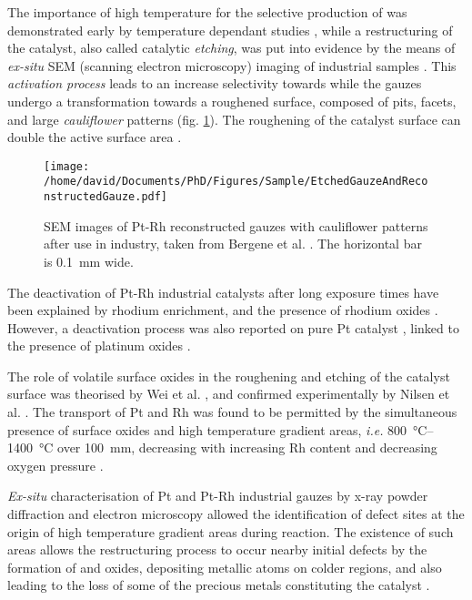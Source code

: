 The importance of high temperature for the selective production of  was demonstrated early by temperature dependant studies \parencite{Nutt1968, Pignet1974, Li1997}, while a restructuring of the catalyst, also called catalytic \textit{etching}, was put into evidence by the means of \textit{ex-situ} SEM (scanning electron microscopy) imaging of industrial samples \parencite{McCabe1974, FlytzaniStephanopoulos1979, McCabe1986}.
This \textit{activation process} leads to an increase selectivity towards  while the gauzes undergo a transformation towards a roughened surface, composed of pits, facets, and large \textit{cauliflower} patterns (fig. \ref{fig:Gauzes}).
The roughening of the catalyst surface can double the active surface area \parencite{Hatscher2008}.

\begin{figure}[!htb]
    \centering
    \texttt{[image: /home/david/Documents/PhD/Figures/Sample/EtchedGauzeAndReconstructedGauze.pdf]}
    \caption{
    SEM images of Pt-Rh reconstructed gauzes with cauliflower patterns after use in industry, taken from Bergene et al. \parencite*{Bergene1996}.
    The horizontal bar is \qty{0.1}{\mm} wide.
    }
    \label{fig:Gauzes}
\end{figure}

The deactivation of Pt-Rh industrial catalysts after long exposure times have been explained by rhodium enrichment, and the presence of rhodium oxides \parencite{Fierro1990, Fierro1992, Bergene1996}.
However, a deactivation process was also reported on pure Pt catalyst \parencite{Ostermaier1974}, linked to the presence of platinum oxides \parencite{Ostermaier1976}.

The role of volatile surface oxides in the roughening and etching of the catalyst surface was theorised by Wei et al. \parencite*{Wei1996}, and confirmed experimentally by Nilsen et al. \parencite*{Nilsen2001}.
The transport of Pt and Rh was found to be permitted by the simultaneous presence of surface oxides and high temperature gradient areas, \textit{i.e.} \qtyrange{800}{1400}{\degreeCelsius} over \qty{100}{\mm}, decreasing with increasing Rh content and decreasing oxygen pressure \parencite{Hannevold2005a}.

\textit{Ex-situ} characterisation of Pt and Pt-Rh industrial gauzes by x-ray powder diffraction and electron microscopy allowed the identification of defect sites at the origin of high temperature gradient areas during reaction.
The existence of such areas allows the restructuring process to occur nearby initial defects by the formation of  and  oxides, depositing metallic atoms on colder regions, and also leading to the loss of some of the precious metals constituting the catalyst \parencite{Hannevold2005}.

